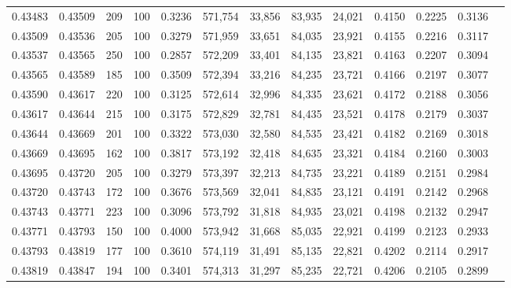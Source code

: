 \begin{tabular}{rrrrrrrrrrrrr}
0.43483 & 0.43509 &   209 & 100 &                                     0.3236 & 571,754 &  33,856 &  83,935 &  24,021 & 0.4150 & 0.2225 & 0.3136 \\
0.43509 & 0.43536 &   205 & 100 &                                     0.3279 & 571,959 &  33,651 &  84,035 &  23,921 & 0.4155 & 0.2216 & 0.3117 \\
0.43537 & 0.43565 &   250 & 100 &                                     0.2857 & 572,209 &  33,401 &  84,135 &  23,821 & 0.4163 & 0.2207 & 0.3094 \\
0.43565 & 0.43589 &   185 & 100 &                                     0.3509 & 572,394 &  33,216 &  84,235 &  23,721 & 0.4166 & 0.2197 & 0.3077 \\
0.43590 & 0.43617 &   220 & 100 &                                     0.3125 & 572,614 &  32,996 &  84,335 &  23,621 & 0.4172 & 0.2188 & 0.3056 \\
0.43617 & 0.43644 &   215 & 100 &                                     0.3175 & 572,829 &  32,781 &  84,435 &  23,521 & 0.4178 & 0.2179 & 0.3037 \\
0.43644 & 0.43669 &   201 & 100 &                                     0.3322 & 573,030 &  32,580 &  84,535 &  23,421 & 0.4182 & 0.2169 & 0.3018 \\
0.43669 & 0.43695 &   162 & 100 &                                     0.3817 & 573,192 &  32,418 &  84,635 &  23,321 & 0.4184 & 0.2160 & 0.3003 \\
0.43695 & 0.43720 &   205 & 100 &                                     0.3279 & 573,397 &  32,213 &  84,735 &  23,221 & 0.4189 & 0.2151 & 0.2984 \\
0.43720 & 0.43743 &   172 & 100 &                                     0.3676 & 573,569 &  32,041 &  84,835 &  23,121 & 0.4191 & 0.2142 & 0.2968 \\
0.43743 & 0.43771 &   223 & 100 &                                     0.3096 & 573,792 &  31,818 &  84,935 &  23,021 & 0.4198 & 0.2132 & 0.2947 \\
0.43771 & 0.43793 &   150 & 100 &                                     0.4000 & 573,942 &  31,668 &  85,035 &  22,921 & 0.4199 & 0.2123 & 0.2933 \\
0.43793 & 0.43819 &   177 & 100 &                                     0.3610 & 574,119 &  31,491 &  85,135 &  22,821 & 0.4202 & 0.2114 & 0.2917 \\
0.43819 & 0.43847 &   194 & 100 &                                     0.3401 & 574,313 &  31,297 &  85,235 &  22,721 & 0.4206 & 0.2105 & 0.2899 \\

\end{tabular}
